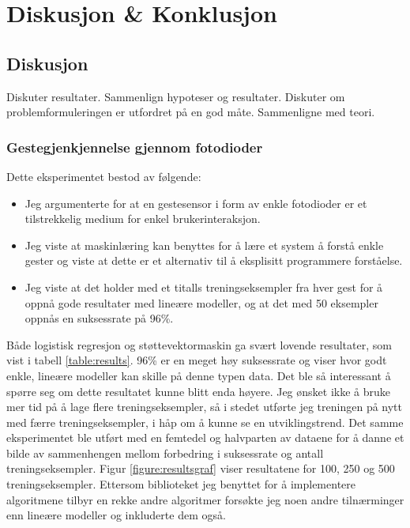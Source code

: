 \section[Diskusjon \& Konklusjon]{Diskusjon \& Konklusjon}
\subsection{Diskusjon}
{\color{blue}Diskuter resultater. Sammenlign hypoteser og resultater. Diskuter om problemformuleringen er utfordret på en god måte. Sammenligne med teori.}

\subsubsection*{Gestegjenkjennelse gjennom fotodioder}
Dette eksperimentet bestod av følgende:
\begin{itemize}
\item Jeg argumenterte for at en gestesensor i form av enkle fotodioder er et tilstrekkelig medium for enkel brukerinteraksjon.
\item Jeg viste at maskinlæring kan benyttes for å lære et system å forstå enkle gester og viste at dette er et alternativ til å eksplisitt programmere forståelse.
\item Jeg viste at det holder med et titalls treningseksempler fra hver gest for å oppnå gode resultater med lineære modeller, og at det med 50 eksempler oppnås en suksessrate på 96\%.
\end{itemize}

Både logistisk regresjon og støttevektormaskin ga svært lovende resultater, som vist i tabell \ref{table:results}. 96\% er en meget høy suksessrate og viser hvor godt enkle, lineære modeller kan skille på denne typen data. Det ble så interessant å spørre seg om dette resultatet kunne blitt enda høyere. Jeg ønsket ikke å bruke mer tid på å lage flere treningseksempler, så i stedet utførte jeg treningen på nytt med færre treningseksempler, i håp om å kunne se en utviklingstrend. Det samme eksperimentet ble utført med en femtedel og halvparten av dataene for å danne et bilde av sammenhengen mellom forbedring i suksessrate og antall treningseksempler. Figur \ref{figure:resultsgraf} viser resultatene for 100, 250 og 500 treningseksempler. Ettersom biblioteket jeg benyttet for å implementere algoritmene tilbyr en rekke andre algoritmer forsøkte jeg noen andre tilnærminger enn lineære modeller og inkluderte dem også.


